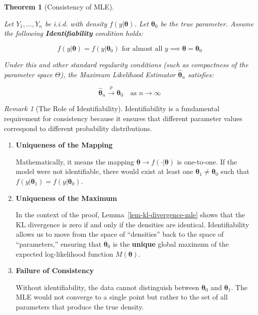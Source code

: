 \documentclass[
  letterpaper,
  DIV=11,
  numbers=noendperiod]{scrreprt}
\renewcommand{\[}{\begin{equation}}
\renewcommand{\]}{\end{equation}}
\theoremstyle{definition}
\theoremstyle{plain}
\theoremstyle{plain}
\theoremstyle{plain}
\newtheorem{theorem}{Theorem}[chapter]
\theoremstyle{definition}
\theoremstyle{plain}
\theoremstyle{remark}
\newtheorem{refremark}{Remark}[chapter]
\begin{document}
\begin{theorem}[Consistency of
MLE]\protect\hypertarget{thm-mle-consistency}{}\label{thm-mle-consistency}

Let \(Y_1, \dots, Y_n\) be i.i.d. with density
\(f(y|\boldsymbol{\theta})\). Let \(\boldsymbol{\theta}_0\) be the true
parameter. Assume the following \textbf{Identifiability} condition
holds:

\[
f(y|\boldsymbol{\theta}) = f(y|\boldsymbol{\theta}_0) \text{ for almost all } y \implies \boldsymbol{\theta} = \boldsymbol{\theta}_0
\]

Under this and other standard regularity conditions (such as compactness
of the parameter space \(\Theta\)), the Maximum Likelihood Estimator
\(\hat{\boldsymbol{\theta}}_n\) satisfies:

\[
\hat{\boldsymbol{\theta}}_n \xrightarrow{p} \boldsymbol{\theta}_0 \quad \text{as } n \to \infty
\]

\end{theorem}

\begin{refremark}[The Role of Identifiability]
Identifiability is a fundamental requirement for consistency because it
ensures that different parameter values correspond to different
probability distributions.

\begin{enumerate}
\def\labelenumi{\arabic{enumi}.}
\item
  \textbf{Uniqueness of the Mapping}

  Mathematically, it means the mapping
  \(\boldsymbol{\theta} \to f(\cdot|\boldsymbol{\theta})\) is
  one-to-one. If the model were not identifiable, there would exist at
  least one \(\boldsymbol{\theta}_1 \neq \boldsymbol{\theta}_0\) such
  that \(f(y|\boldsymbol{\theta}_1) = f(y|\boldsymbol{\theta}_0)\).
\item
  \textbf{Uniqueness of the Maximum}

  In the context of the proof, Lemma~\ref{lem-kl-divergence-mle} shows
  that the KL divergence is zero if and only if the densities are
  identical. Identifiability allows us to move from the space of
  ``densities'' back to the space of ``parameters,'' ensuring that
  \(\boldsymbol{\theta}_0\) is the \textbf{unique} global maximum of the
  expected log-likelihood function \(M(\boldsymbol{\theta})\).
\item
  \textbf{Failure of Consistency}

  Without identifiability, the data cannot distinguish between
  \(\boldsymbol{\theta}_0\) and \(\boldsymbol{\theta}_1\). The MLE would
  not converge to a single point but rather to the set of all parameters
  that produce the true density.
\end{enumerate}

\label{rem-identifiability}

\end{refremark}
\end{document}
